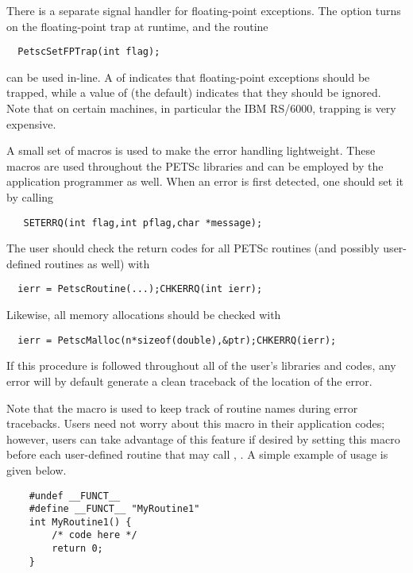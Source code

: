 There is a separate signal handler for floating-point exceptions.
  
The option  turns on the floating-point trap at runtime,
and the routine   
\begin{verbatim}
  PetscSetFPTrap(int flag);
\end{verbatim}
can be used in-line.
A  of  
indicates that floating-point exceptions should be trapped,
while a value of  (the default) indicates that they 
should be ignored.  Note that on certain machines, in particular 
the IBM RS/6000, trapping is very expensive.

A small set of macros is used to make the error handling lightweight.
These macros are used throughout the PETSc libraries and can be employed
by the application   
programmer as well.  When an error is first detected, 
one should set it by calling
\begin{verbatim}
   SETERRQ(int flag,int pflag,char *message);
\end{verbatim}
The user should check the return codes for all PETSc routines (and
possibly user-defined routines as well) with 
\begin{verbatim}
  ierr = PetscRoutine(...);CHKERRQ(int ierr);
\end{verbatim}
Likewise, all memory allocations should be checked with 
\begin{verbatim}
  ierr = PetscMalloc(n*sizeof(double),&ptr);CHKERRQ(ierr);
\end{verbatim}
If this procedure is followed throughout all of the user's libraries 
and codes, any error will by default generate a clean traceback of 
the location  
of the error. 

Note that the macro  is used to keep track of
routine names during error tracebacks.  Users need not worry about this
macro in their application codes; however, users can take advantage of this feature
if desired by setting this macro before each user-defined routine
that may call , .
A simple example of usage is given below.
\begin{verbatim}
    #undef __FUNCT__  
    #define __FUNCT__ "MyRoutine1"
    int MyRoutine1() { 
        /* code here */
        return 0;
    }
\end{verbatim}


